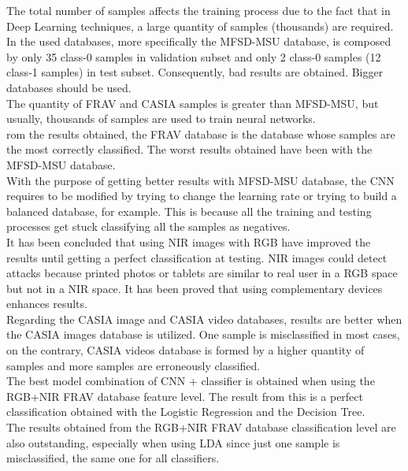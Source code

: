 The total number of samples affects the training process due to the fact that in Deep Learning techniques, a large quantity of samples (thousands) are required. In the used databases, more specifically the MFSD-MSU database, is composed by only 35 class-0 samples in validation subset and only 2 class-0 samples (12 class-1 samples) in test subset. Consequently, bad results are obtained. Bigger databases should be used.\\

The quantity of FRAV and CASIA samples is greater than MFSD-MSU, but usually, thousands of samples are used to train neural networks.\\

rom the  results obtained, the FRAV database is the database whose samples are the most correctly classified. The worst results obtained have been with the MFSD-MSU database.\\

With the purpose of getting better results with MFSD-MSU database, the CNN requires to be modified by trying to change the learning rate or trying to build a balanced database, for example. This is because all the training and testing processes get stuck classifying all the samples as negatives.\\

It has been concluded that using NIR images with RGB have improved the results until getting a perfect classification at testing. NIR images could detect attacks because printed photos or tablets are similar to real user in a RGB space but not in a NIR space. It has been proved that using complementary devices enhances results.\\

Regarding the CASIA image and CASIA video databases, results are  better when the CASIA images database is utilized. One sample is misclassified in most cases, on the contrary, CASIA videos database is formed by a higher quantity of samples and more samples are erroneously classified.\\

The best model combination of CNN + classifier is obtained when using the RGB+NIR FRAV database feature level. The result from this is a perfect classification obtained with the Logistic Regression and the Decision Tree.\\

The results obtained from the RGB+NIR FRAV database classification level are also outstanding, especially when using LDA since just one sample is misclassified, the same one for all classifiers.\\

